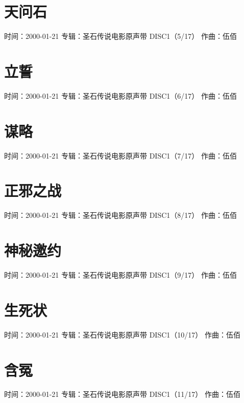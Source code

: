 \documentclass[UTF8,a4paper,oneside,twocolumn,12pt]{ctexbook}
\newcommand{\infopair}[2]{\textbullet #1：#2}
\newcommand{\zq}[1][伍佰]{\infopair{作曲}{#1}}
\newcommand{\zj}[1]{\infopair{专辑}{#1}}
\newcommand{\sj}[1]{\infopair{时间}{#1}}
\newenvironment{info}{\begin{flushleft}\kaishu
	}
	{\end{flushleft}\normalsize\yahei\par}
\begin{document}
\section{天问石}
\begin{info}
	\sj{2000-01-21}
	\zj{圣石传说电影原声带 DISC1（5/17）}
	\zq
\end{info}

\section{立誓}
\begin{info}
	\sj{2000-01-21}
	\zj{圣石传说电影原声带 DISC1（6/17）}
	\zq
\end{info}

\section{谋略}
\begin{info}
	\sj{2000-01-21}
	\zj{圣石传说电影原声带 DISC1（7/17）}
	\zq
\end{info}

\section{正邪之战}
\begin{info}
	\sj{2000-01-21}
	\zj{圣石传说电影原声带 DISC1（8/17）}
	\zq
\end{info}

\section{神秘邀约}
\begin{info}
	\sj{2000-01-21}
	\zj{圣石传说电影原声带 DISC1（9/17）}
	\zq
\end{info}

\section{生死状}
\begin{info}
	\sj{2000-01-21}
	\zj{圣石传说电影原声带 DISC1（10/17）}
	\zq
\end{info}

\section{含冤}
\begin{info}
	\sj{2000-01-21}
	\zj{圣石传说电影原声带 DISC1（11/17）}
	\zq
\end{info}
\end{document}
